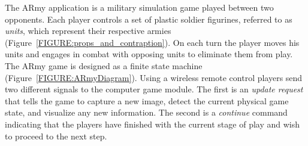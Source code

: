 \documentclass[10pt,twocolumn,letterpaper]{article}
\begin{document}

The ARmy application is a military simulation game played between two
opponents.  Each player controls 
a set of plastic soldier
figurines, referred to as \emph{units}, which represent their
respective armies (Figure~\ref{FIGURE:props_and_contraption}).  
On each turn the player moves his units and
engages in combat with opposing units to eliminate them from
play.
%
The ARmy game
is designed as a finite state machine
(Figure~\ref{FIGURE:ARmyDiagram}).  Using a wireless remote control
players send two different signals to the computer game module.
The first is an {\em update request} that tells the game to capture a
new image, detect the current physical game state, and visualize any
new information.
The second is a {\em continue} command indicating that the
players have finished with the current stage of play and wish to
proceed to the next step.  








\vspace{-0.15in}
\end{document}

